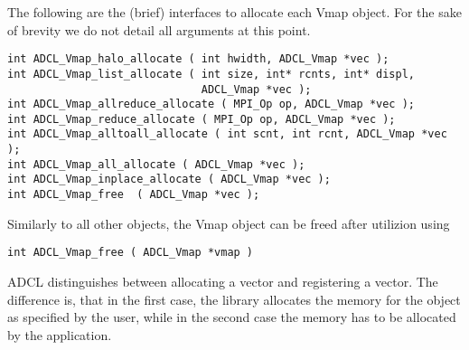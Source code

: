 The following are the (brief) interfaces to allocate each Vmap object. For the
sake of brevity we do not detail all arguments at this point.

\begin{verbatim}
int ADCL_Vmap_halo_allocate ( int hwidth, ADCL_Vmap *vec );
int ADCL_Vmap_list_allocate ( int size, int* rcnts, int* displ, 
                              ADCL_Vmap *vec );
int ADCL_Vmap_allreduce_allocate ( MPI_Op op, ADCL_Vmap *vec );
int ADCL_Vmap_reduce_allocate ( MPI_Op op, ADCL_Vmap *vec );
int ADCL_Vmap_alltoall_allocate ( int scnt, int rcnt, ADCL_Vmap *vec );
int ADCL_Vmap_all_allocate ( ADCL_Vmap *vec );
int ADCL_Vmap_inplace_allocate ( ADCL_Vmap *vec );
int ADCL_Vmap_free  ( ADCL_Vmap *vec );
\end{verbatim}

Similarly to all other objects, the Vmap object can be freed after utilizion
using 

\begin{verbatim}
int ADCL_Vmap_free ( ADCL_Vmap *vmap )
\end{verbatim}

ADCL distinguishes between allocating a
vector and registering a vector. The difference is, that in the first case,
the library allocates the memory for the object as specified by the user,
while in the second case the memory has to be allocated by the application.


